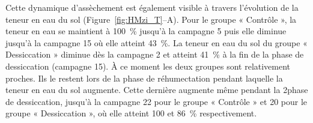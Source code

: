Cette dynamique d'assèchement est également visible à travers l'évolution de la teneur en eau du sol (Figure~\ref{fig:HMzi_T}--A).
Pour le groupe « Contrôle », la teneur en eau se maintient à \SI{100}{\percent} jusqu'à la campagne 5 puis elle diminue jusqu'à la campagne 15 où elle atteint \SI{43}{\percent}.
La teneur en eau du sol du groupe « Dessiccation » diminue dès la campagne 2 et atteint \SI{41}{\percent} à la fin de la phase de dessiccation (campagne 15).
À ce moment les deux groupes sont relativement proches.
Ils le restent lors de la phase de réhumectation pendant laquelle la teneur en eau du sol augmente.
Cette dernière augmente même pendant la 2\ieme phase de dessiccation, jusqu'à la campagne 22 pour le groupe « Contrôle » et 20 pour le groupe « Dessiccation », où elle atteint 100 et \SI{86}{\percent} respectivement.



